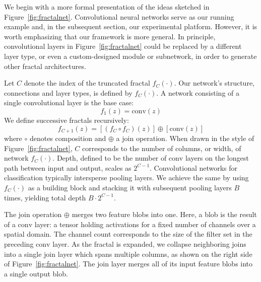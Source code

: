 We begin with a more formal presentation of the ideas sketched in
Figure~\ref{fig:fractalnet}.  Convolutional neural networks serve as our
running example and, in the subsequent section, our experimental platform.
However, it is worth emphasizing that our framework is more general.  In
principle, convolutional layers in Figure~\ref{fig:fractalnet} could be
replaced by a different layer type, or even a custom-designed module or
subnetwork, in order to generate other fractal architectures.

Let $C$ denote the index of the truncated fractal $f_C(\cdot)$.  Our network's
structure, connections and layer types, is defined by $f_C(\cdot)$.  A network
consisting of a single convolutional layer is the base case:
\begin{equation}
   f_1(z) = \mathrm{conv}(z)
   \label{eq:frac-base}
\end{equation}
We define successive fractals recursively:
\begin{equation}
    f_{C+1}(z) =
      \left[(f_C \circ f_C)(z)\right] \oplus
      \left[\mathrm{conv}(z)\right]
   \label{eq:frac-gen}
\end{equation}
where $\circ$ denotes composition and $\oplus$ a join operation.  When drawn
in the style of Figure~\ref{fig:fractalnet}, $C$ corresponds to the number of
columns, or width, of network $f_C(\cdot)$.  Depth, defined to be the number of
$\mathrm{conv}$ layers on the longest path between input and output, scales as
$2^{C-1}$.  Convolutional networks for classification typically intersperse
pooling layers.  We achieve the same by using $f_C(\cdot)$ as a building block
and stacking it with subsequent pooling layers $B$ times, yielding total depth
$B \cdot 2^{C-1}$.

The join operation $\oplus$ merges two feature blobs into one.  Here, a blob
is the result of a $\mathrm{conv}$ layer: a tensor holding activations for a
fixed number of channels over a spatial domain.  The channel count corresponds
to the size of the filter set in the preceding $\mathrm{conv}$ layer.  As the
fractal is expanded, we collapse neighboring joins into a single
$\mathrm{join}$ layer which spans multiple columns, as shown on the right side
of Figure~\ref{fig:fractalnet}.  The $\mathrm{join}$ layer merges all of its
input feature blobs into a single output blob.

